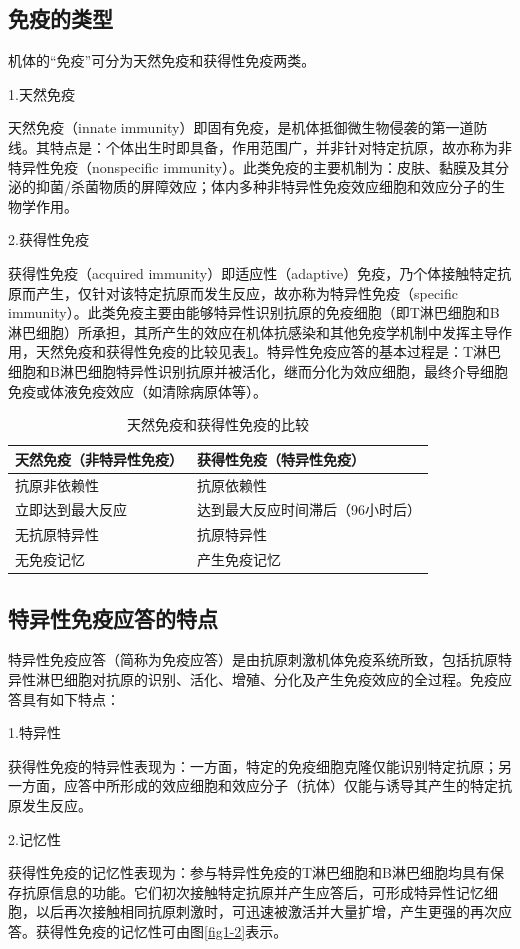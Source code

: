 \subsection{免疫的类型}

机体的“免疫”可分为天然免疫和获得性免疫两类。

1.天然免疫

天然免疫（innate
immunity）即固有免疫，是机体抵御微生物侵袭的第一道防线。其特点是：个体出生时即具备，作用范围广，并非针对特定抗原，故亦称为非特异性免疫（nonspecific
immunity）。此类免疫的主要机制为：皮肤、黏膜及其分泌的抑菌/杀菌物质的屏障效应；体内多种非特异性免疫效应细胞和效应分子的生物学作用。

2.获得性免疫

获得性免疫（acquired
immunity）即适应性（adaptive）免疫，乃个体接触特定抗原而产生，仅针对该特定抗原而发生反应，故亦称为特异性免疫（specific
immunity）。此类免疫主要由能够特异性识别抗原的免疫细胞（即T淋巴细胞和B淋巴细胞）所承担，其所产生的效应在机体抗感染和其他免疫学机制中发挥主导作用，天然免疫和获得性免疫的比较见表\ref{tab1-2}。特异性免疫应答的基本过程是：T淋巴细胞和B淋巴细胞特异性识别抗原并被活化，继而分化为效应细胞，最终介导细胞免疫或体液免疫效应（如清除病原体等）。

\begin{longtable}[]{@{}ll@{}}
\caption{天然免疫和获得性免疫的比较}
\label{tab1-2}\\
\toprule
天然免疫（非特异性免疫） & 获得性免疫（特异性免疫）\tabularnewline
\midrule
\endhead
抗原非依赖性 & 抗原依赖性\tabularnewline
立即达到最大反应 & 达到最大反应时间滞后（96小时后）\tabularnewline
无抗原特异性 & 抗原特异性\tabularnewline
无免疫记忆 & 产生免疫记忆\tabularnewline
\bottomrule
\end{longtable}


\subsection{特异性免疫应答的特点}

特异性免疫应答（简称为免疫应答）是由抗原刺激机体免疫系统所致，包括抗原特异性淋巴细胞对抗原的识别、活化、增殖、分化及产生免疫效应的全过程。免疫应答具有如下特点：

1.特异性

获得性免疫的特异性表现为：一方面，特定的免疫细胞克隆仅能识别特定抗原；另一方面，应答中所形成的效应细胞和效应分子（抗体）仅能与诱导其产生的特定抗原发生反应。

2.记忆性

获得性免疫的记忆性表现为：参与特异性免疫的T淋巴细胞和B淋巴细胞均具有保存抗原信息的功能。它们初次接触特定抗原并产生应答后，可形成特异性记忆细胞，以后再次接触相同抗原刺激时，可迅速被激活并大量扩增，产生更强的再次应答。获得性免疫的记忆性可由图\ref{fig1-2}表示。

